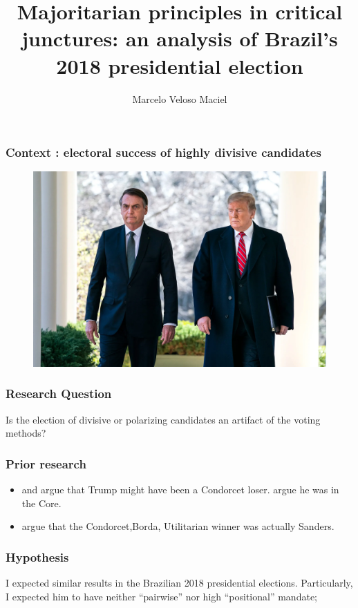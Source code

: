 \documentclass{beamer}
\title{Majoritarian principles in critical junctures: an analysis of Brazil's
  2018 presidential election}
\date{}
\author{Marcelo Veloso Maciel}
\institute{University of California, Irvine}
\begin{document}
\maketitle

\begin{frame}
\frametitle{Context : electoral success of highly divisive candidates}
  \begin{figure}[H] \centering \includegraphics[width=\textwidth]{./trumpolnaro.png}
 \end{figure}
\end{frame}

\begin{frame}
  \frametitle{Research Question }
  Is the election of divisive or polarizing candidates an artifact of the voting
  methods?
\end{frame}

\begin{frame}
  \frametitle{Prior research}
  \begin{itemize}
    \item \textcite{potthoff2021condorcet} and \textcite{kurrild2018trump} argue
          that Trump might have been a Condorcet loser. \textcite{woon2020trump}
          argue he was in the Core.
    \item \textcite{igersheim22_compar_votin_method} argue that the
          Condorcet,Borda, Utilitarian winner was actually Sanders.
  \end{itemize}
\end{frame}

\begin{frame}
  \frametitle{Hypothesis}
  I expected similar results in the Brazilian 2018 presidential elections.
  Particularly, I expected him to have neither ``pairwise'' nor high
  ``positional'' mandate;
\end{frame}
\end{document}
